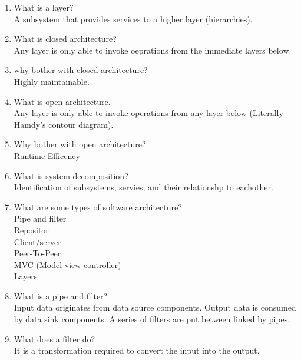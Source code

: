 \documentclass[10pt]{article}
\begin{document}
\begin{enumerate}
      \item What is a layer?\\
            A subsystem that provides services to a higher layer (hierarchies).

      \item What is closed architecture?\\
            Any layer is only able to invoke oeprations from the immediate layers below.

      \item why bother with closed architecture?\\
            Highly maintainable.\\

      \item What is open architecture.\\
            Any layer is only able to invoke operations from any layer below (Literally Hamdy's contour diagram).\\

      \item Why bother with open architecture?\\
            Runtime Efficency\\

      \item What is system decomposition?\\
            Identification of subsystems, servies, and their relationshp to eachother.\\

      \item What are some types of software architecture?\\
            Pipe and filter\\
            Repositor\\
            Client/server\\
            Peer-To-Peer\\
            MVC (Model view controller)\\
            Layers\\

      \item What is a pipe and filter?\\
            Input data originates from data source components. Output data is consumed by data sink components. A series of
            filters are put between linked by pipes.\\

      \item What does a filter do?\\
            It is a transformation required to convert the input into the output.\\


\end{enumerate}
\end{document}
